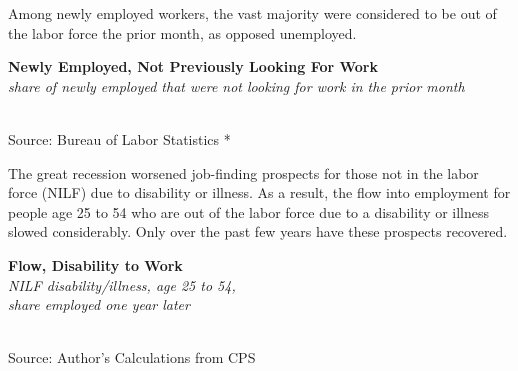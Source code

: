 \documentclass{report}
\makeatletter
\newcommand{\tbllink}[1]{\href{https://raw.githubusercontent.com/bdecon/US-chartbook/master/chartbook/data/#1}{\faTable}}
\newcommand*\short[1]{\expandafter\@gobbletwo\number\numexpr#1\relax}
\newcommand{\dateaxisticks}{
		date coordinates in=x, axis line style={draw=none},
		xmax={2020-05-10},
		max space between ticks=40,	    
		xtick={{1990-01-01}, {1992-01-01}, {1994-01-01}, 
			{1996-01-01}, {1998-01-01}, {2000-01-01}, 
			{2002-01-01}, {2004-01-01}, {2006-01-01},
			{2008-01-01}, {2010-01-01}, {2012-01-01}, {2014-01-01},
		    {2016-01-01}, {2018-01-01}, {2020-01-01}},
		minor xtick={{1989-01-01}, {1991-01-01}, {1993-01-01},
			{1995-01-01}, {1997-01-01}, {1999-01-01}, 
			{2001-01-01}, {2003-01-01}, {2005-01-01}, {2007-01-01},
		    {2009-01-01}, {2011-01-01}, {2013-01-01}, {2015-01-01},
		    {2017-01-01}, {2019-01-01}},
		enlarge y limits={0.06}, enlarge x limits={0.01},
		}
\newcommand{\shdateaxisticks}{
		date coordinates in=x, axis line style={draw=none},
		xmax={2021-02-01},
		max space between ticks=40,	    
		xtick={{1990-01-01}, {1995-01-01}, {2000-01-01}, 
			{2005-01-01}, {2010-01-01}, {2015-01-01}, {2020-01-01}},
		minor xtick={},
		enlarge y limits={0.06}, enlarge x limits={0.01},
		}
\newcommand{\bbar}[2]{extra #1 ticks = {{#2}}, extra #1 tick labels = ,
		extra #1 tick style = {grid=major, grid style={thick, black!25}},}
\newcommand{\stdline}[4]{\addplot[very thick, no markers, color=#1] 
		table [x=#2, y=#3, col sep=comma] {#4};	}
\newcommand{\rbars}{
		\fill[color=black!10] (axis cs:{1990-07-01},\pgfkeysvalueof{/pgfplots/ymin}) rectangle 
			(axis cs:{1991-03-01}, \pgfkeysvalueof{/pgfplots/ymax});
		\fill[color=black!10] (axis cs:{2007-12-01},\pgfkeysvalueof{/pgfplots/ymin}) rectangle 
			(axis cs:{2009-07-01}, \pgfkeysvalueof{/pgfplots/ymax});
		\fill[color=black!10] (axis cs:{2001-03-01},\pgfkeysvalueof{/pgfplots/ymin}) rectangle 
			(axis cs:{2001-11-01}, \pgfkeysvalueof{/pgfplots/ymax});}
\newcommand{\rebars}{
		\fill[color=black!10] (axis cs:{2007-12-01},\pgfkeysvalueof{/pgfplots/ymin}) rectangle 
			(axis cs:{2009-07-01}, \pgfkeysvalueof{/pgfplots/ymax});
		\fill[color=black!10] (axis cs:{2001-03-01},\pgfkeysvalueof{/pgfplots/ymin}) rectangle 
			(axis cs:{2001-11-01}, \pgfkeysvalueof{/pgfplots/ymax});}
\makeatother
\begin{document}
{{{{{{{{{\begin{minipage}{0.76\textwidth}
Among newly employed workers, the vast majority were considered to be out of the labor force the prior month, as opposed unemployed.  \\

\vspace{2mm}

\noindent \normalsize \textbf{Newly Employed, Not Previously Looking For Work}\\
\footnotesize{\textit{share of newly employed that were not looking for work in the prior month}}\\
\noindent \hspace*{-2mm} \\
\footnotesize{Source: Bureau of Labor Statistics} \hfill \tbllink{lf_flow.csv}*

\end{minipage}

\vspace{5mm}

\begin{minipage}{0.33\textwidth}
\small The great recession worsened job-finding prospects for those not in the labor force (NILF) due to disability or illness. As a result, the flow into employment for people age 25 to 54 who are out of the labor force due to a disability or illness slowed considerably. Only over the past few years have these prospects recovered. 
\end{minipage} \hspace{5mm} \begin{minipage}{0.39\textwidth}
\noindent \normalsize \textbf{Flow, Disability to Work}\\
\footnotesize{\textit{NILF disability/illness, age 25 to 54,}}\\
\footnotesize{\textit{share employed one year later}}\\
\noindent \hspace*{-2mm} \\
\footnotesize{Source: Author's Calculations from CPS} \hfill \tbllink{disflow.csv}
\end{minipage}

}}}}}}}}}
\end{document}
